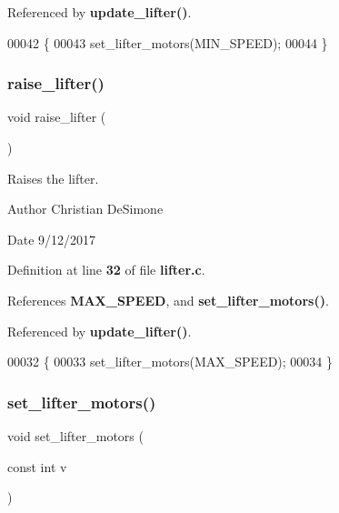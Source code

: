 Referenced by \textbf{ update\+\_\+lifter()}.


\begin{DoxyCode}
00042                    \{
00043   set_lifter_motors(MIN_SPEED);
00044 \}
\end{DoxyCode}
\mbox{\label{lifter_8h_a7452163ed7946b6262f41de51c62dfd4}} 
\subsubsection{raise\+\_\+lifter()}
{\footnotesize\ttfamily void raise\+\_\+lifter (\begin{DoxyParamCaption}{ }\end{DoxyParamCaption})}



Raises the lifter. 

\begin{DoxyAuthor}{Author}
Christian De\+Simone 
\end{DoxyAuthor}
\begin{DoxyDate}{Date}
9/12/2017 
\end{DoxyDate}


Definition at line \textbf{ 32} of file \textbf{ lifter.\+c}.



References \textbf{ M\+A\+X\+\_\+\+S\+P\+E\+ED}, and \textbf{ set\+\_\+lifter\+\_\+motors()}.



Referenced by \textbf{ update\+\_\+lifter()}.


\begin{DoxyCode}
00032                    \{
00033   set_lifter_motors(MAX_SPEED);
00034 \}
\end{DoxyCode}
\mbox{\label{lifter_8h_a16ed2ef406519bbd4d091f6321f4ed8a}} 
\subsubsection{set\+\_\+lifter\+\_\+motors()}
{\footnotesize\ttfamily void set\+\_\+lifter\+\_\+motors (\begin{DoxyParamCaption}\item[{const int}]{v }\end{DoxyParamCaption})}



